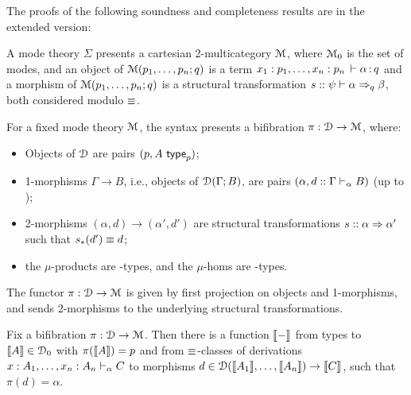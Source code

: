 The proofs of the following soundness and completeness results are in
the extended version:

\begin{theorem}
\label{thm:completeness-mode-theory}
A mode theory $\Sigma$ presents a cartesian 2-multicategory $\mathcal{M}$, where
$\mathcal{M}_0$ is the set of modes, and an object of $\mathcal{M}(p_1,\ldots,p_n;q)$ is a
term $x_1:p_1,\ldots,x_n:p_n \, \vdash \alpha \, \mathit{:} \, q$ and a morphism of $\mathcal{M}(p_1,\ldots,p_n;q)$ is a structural transformation
$s :: \psi \vdash \alpha \Rightarrow_{q} \beta$, both considered modulo $\equiv$.
\end{theorem}

\begin{theorem}
For a fixed mode theory $\mathcal{M}$, the syntax presents a bifibration $\pi : \mathcal{D} \to \mathcal{M}$, where:
\begin{itemize}
\item Objects of $\mathcal{D}$ are pairs $(p, A \,\, \mathsf{type}_{p})$;
\item 1-morphisms $\Gamma \to B$, i.e., objects of $\mathcal{D}(\Gamma; B)$, are pairs $(\alpha, d :: \Gamma \vdash_{\alpha} B)$ (up to \deq); 
\item 2-morphisms $(\alpha, d) \to (\alpha', d')$ are structural
  transformations $s :: \alpha \Rightarrow \alpha'$ such that $s_*(d') \equiv d$;
\item the $\mu$-products are \Fsymb-types, and the $\mu$-homs are \Usymb-types.
\end{itemize}
The functor $\pi : \mathcal{D} \to \mathcal{M}$ is given by first projection on objects and 1-morphisms, and sends 2-morphisms to the underlying structural transformations.
\end{theorem}

\begin{theorem}
Fix a bifibration $\pi : \mathcal{D} \to \mathcal{M}$.  Then there is a function $\llbracket -
\rrbracket$ from types  to $\llbracket A \rrbracket \in \mathcal{D}_0$ with $\pi(\llbracket
A \rrbracket) = p$ and from $\equiv$-classes of derivations $x:A_1, \ldots,
  x_n:A_n \vdash_{\alpha} C$ to morphisms $d \in \mathcal{D}(\llbracket A_1 \rrbracket, \dots, \llbracket
A_n \rrbracket) \to \llbracket C \rrbracket$, such that $\pi(d) = \alpha$.
\end{theorem}

